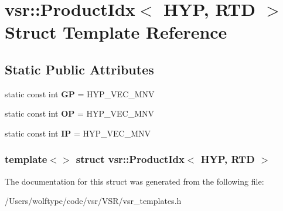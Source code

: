 \hypertarget{structvsr_1_1_product_idx_3_01_h_y_p_00_01_r_t_d_01_4}{\section{vsr\-:\-:Product\-Idx$<$ H\-Y\-P, R\-T\-D $>$ Struct Template Reference}
\label{structvsr_1_1_product_idx_3_01_h_y_p_00_01_r_t_d_01_4}
}
\subsection*{Static Public Attributes}
\begin{DoxyCompactItemize}
\item 
\hypertarget{structvsr_1_1_product_idx_3_01_h_y_p_00_01_r_t_d_01_4_a5660403905e606ce235d3009b4632d5e}{static const int {\bfseries G\-P} = H\-Y\-P\-\_\-\-V\-E\-C\-\_\-\-M\-N\-V}\label{structvsr_1_1_product_idx_3_01_h_y_p_00_01_r_t_d_01_4_a5660403905e606ce235d3009b4632d5e}

\item 
\hypertarget{structvsr_1_1_product_idx_3_01_h_y_p_00_01_r_t_d_01_4_aea05de3831fcdc6e8c851d4a051781e0}{static const int {\bfseries O\-P} = H\-Y\-P\-\_\-\-V\-E\-C\-\_\-\-M\-N\-V}\label{structvsr_1_1_product_idx_3_01_h_y_p_00_01_r_t_d_01_4_aea05de3831fcdc6e8c851d4a051781e0}

\item 
\hypertarget{structvsr_1_1_product_idx_3_01_h_y_p_00_01_r_t_d_01_4_a92d1417b7f397b0f2d7ff5fa73173940}{static const int {\bfseries I\-P} = H\-Y\-P\-\_\-\-V\-E\-C\-\_\-\-M\-N\-V}\label{structvsr_1_1_product_idx_3_01_h_y_p_00_01_r_t_d_01_4_a92d1417b7f397b0f2d7ff5fa73173940}

\end{DoxyCompactItemize}
\subsubsection*{template$<$$>$ struct vsr\-::\-Product\-Idx$<$ H\-Y\-P, R\-T\-D $>$}



The documentation for this struct was generated from the following file\-:\begin{DoxyCompactItemize}
\item 
/\-Users/wolftype/code/vsr/\-V\-S\-R/vsr\-\_\-templates.\-h\end{DoxyCompactItemize}
